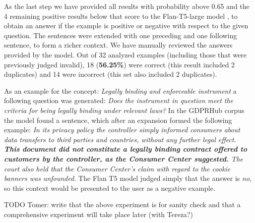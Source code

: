 As the last step we have provided all results with probability above 0.65 and the 4 remaining positive results below that score
to the Flan-T5-large model \cite{wei2021finetuned,raffel2020exploring}, to obtain an answer if the example is positive or negative
with respect to the given question. The sentences were extended with one preceding and one following sentence, to form a richer context.
We have manually reviewed the answers provided by the model. Out of 32 analyzed examples (including those  
that were previously judged invalid), 18 (\textbf{56.25\%}) were correct (this result included 2 duplicates) and 14 were incorrect (this set
also included 2 duplicates). 

As an example for the concept: \textit{Legally binding and enforceable
instrument} a following question was generated: \textit{Does the instrument in
question meet the criteria for being legally binding under relevant laws?}
In the GDPRHub corpus the model found a sentence, which after an expansion formed
the following example: \textit{In its privacy policy the controller simply
informed consumers about data transfers to third parties and countries, without
any further legal effect.  \textbf{This document did not constitute a legally binding
contract offered to customers by the controller, as the Consumer Center
suggested.} The court also held that the Consumer Center's claim with regard to
the cookie banners was unfounded.} The Flan T5 model judged simply that the
answer is \textit{no}, so this context would be presented to the user as a
negative example.

TODO Tomer: write that the above experiment is for sanity check and that a comprehensive experiment will take place later (with Tereza?)
